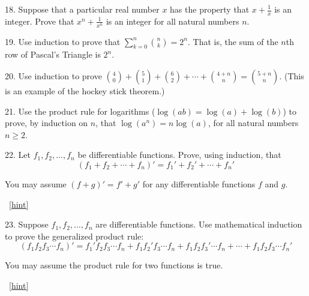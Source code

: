 \documentclass[10pt,]{book}
\theoremstyle{plain}
\theoremstyle{definition}
\theoremstyle{definition}
\theoremstyle{definition}
\numberwithin{equation}{chapter}
\def\d{\displaystyle}
\begin{document}
\begin{exerciselist}
\par\smallskip
\item[18.]\hypertarget{exercise-152}{}\hypertarget{p-2744}{}%
Suppose that a particular real number \(x\) has the property that \(x + \frac{1}{x}\) is an integer. Prove that \(x^n + \frac{1}{x^n}\) is an integer for all natural numbers \(n\).%
\par\smallskip
\item[19.]\hypertarget{exercise-153}{}\hypertarget{p-2747}{}%
Use induction to prove that \(\d\sum_{k=0}^n {n \choose k} = 2^n\). That is, the sum of the \(n\)th row of Pascal's Triangle is \(2^n\).%
\par\smallskip
\item[20.]\hypertarget{exercise-154}{}\hypertarget{p-2748}{}%
Use induction to prove \({4 \choose 0} + {5 \choose 1} + {6 \choose 2} + \cdots + {4+n \choose n} = {5+n \choose n}\). (This is an example of the hockey stick theorem.)%
\par\smallskip
\item[21.]\hypertarget{exercise-155}{}\hypertarget{p-2749}{}%
Use the product rule for logarithms (\(\log(ab) = \log(a) + \log(b)\)) to prove, by induction on \(n\), that \(\log(a^n) = n \log(a)\), for all natural numbers \(n \ge 2\).%
\par\smallskip
\item[22.]\hypertarget{exercise-156}{}\hypertarget{p-2752}{}%
Let \(f_1, f_2,\ldots, f_n\) be differentiable functions. Prove, using induction, that%
\begin{equation*}
(f_1 + f_2 + \cdots + f_n)' = f_1' + f_2' + \cdots + f_n'
\end{equation*}
%
\par
\hypertarget{p-2753}{}%
You may assume \((f+g)' = f' + g'\) for any differentiable functions \(f\) and \(g\).%
\par\smallskip
~\hfill{\tiny\hyperlink{a-B.6.22}{[hint]}\hypertarget{q-B.6.22}{}}\item[23.]\hypertarget{exercise-157}{}\hypertarget{p-2755}{}%
Suppose \(f_1, f_2, \ldots, f_n\) are differentiable functions. Use mathematical induction to prove the generalized product rule:%
\begin{equation*}
(f_1 f_2 f_3 \cdots f_n)' = f_1' f_2 f_3 \cdots f_n + f_1 f_2' f_3 \cdots f_n + f_1 f_2 f_3' \cdots f_n + \cdots + f_1 f_2 f_3 \cdots f_n'
\end{equation*}
%
\par
\hypertarget{p-2756}{}%
You may assume the product rule for two functions is true.%
\par\smallskip
~\hfill{\tiny\hyperlink{a-B.6.23}{[hint]}\hypertarget{q-B.6.23}{}}\end{exerciselist}
\typeout{************************************************}
\typeout{************************************************}
\end{document}
